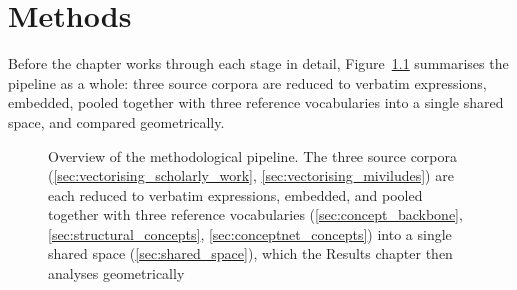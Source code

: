 \chapter{Methods}

Before the chapter works through each stage in detail, Figure~\ref{fig:pipeline_overview} summarises the pipeline as a whole: three source corpora are reduced to verbatim expressions, embedded, pooled together with three reference vocabularies into a single shared space, and compared geometrically.

\begin{figure}[h]
\centering
{}
\caption{Overview of the methodological pipeline. The three source corpora (\ref{sec:vectorising_scholarly_work}, \ref{sec:vectorising_miviludes}) are each reduced to verbatim expressions, embedded, and pooled together with three reference vocabularies (\ref{sec:concept_backbone}, \ref{sec:structural_concepts}, \ref{sec:conceptnet_concepts}) into a single shared space (\ref{sec:shared_space}), which the Results chapter then analyses geometrically}
\label{fig:pipeline_overview}
\end{figure}

